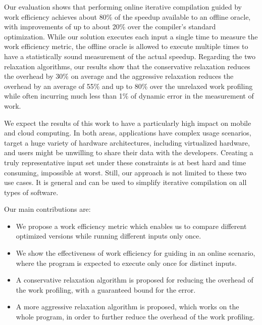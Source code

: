     Our evaluation shows that performing online iterative compilation guided by work efficiency achieves about 80\% of the speedup
    available to an offline oracle, with improvements of up to about 20\% over the compiler's standard optimization. While our solution
    executes each input a single time to measure the work efficiency metric, the offline oracle is allowed to execute multiple times to
    have a statistically sound measurement of the actual speedup. Regarding the two relaxation algorithms, our results show that the
    conservative relaxation reduces the overhead by 30\% on average and the aggressive relaxation reduces the overhead by an average of
    55\% and up to 80\% over the unrelaxed work profiling while often incurring much less than 1\% of dynamic error in the measurement of
    work.

    We expect the results of this work to have a particularly high impact on mobile and cloud computing. In both areas, applications have
    complex usage scenarios, target a huge variety of hardware architectures, including virtualized hardware, and users might be unwilling
    to share their data with the developers. Creating a truly representative input set under these constraints is at best hard and time
    consuming, impossible at worst. Still, our approach is not limited to these two use cases. It is general and can be used to simplify
    iterative compilation on all types of software.

    Our main contributions are:

    \begin{itemize}[leftmargin=3mm]

        \item We propose a work efficiency metric which enables us to compare different optimized versions while running different inputs
        only once.

        \item We show the effectiveness of work efficiency for guiding {\itercomp} in an online scenario, where the program is expected
        to execute only once for distinct inputs.

        \item A conservative relaxation algorithm is proposed for reducing the overhead of the work profiling, with a guaranteed bound for
        the error.

        \item A more aggressive relaxation algorithm is proposed, which works on the whole program, in order to further reduce the overhead
        of the work profiling.
    \end{itemize}
